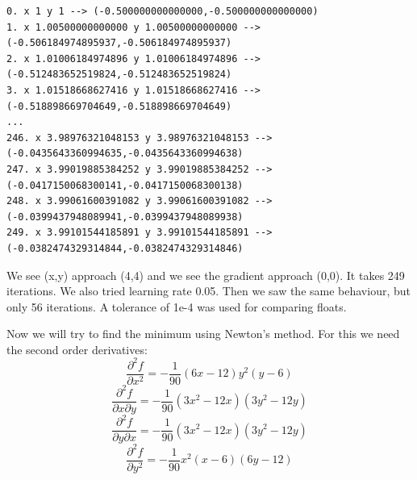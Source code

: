 \documentclass[12pt, letterpaper]{article}
\begin{document}
{\footnotesize
\begin{verbatim}
0. x 1 y 1 --> (-0.500000000000000,-0.500000000000000)
1. x 1.00500000000000 y 1.00500000000000 --> (-0.506184974895937,-0.506184974895937)
2. x 1.01006184974896 y 1.01006184974896 --> (-0.512483652519824,-0.512483652519824)
3. x 1.01518668627416 y 1.01518668627416 --> (-0.518898669704649,-0.518898669704649)
...
246. x 3.98976321048153 y 3.98976321048153 --> (-0.0435643360994635,-0.0435643360994638)
247. x 3.99019885384252 y 3.99019885384252 --> (-0.0417150068300141,-0.0417150068300138)
248. x 3.99061600391082 y 3.99061600391082 --> (-0.0399437948089941,-0.0399437948089938)
249. x 3.99101544185891 y 3.99101544185891 --> (-0.0382474329314844,-0.0382474329314846)
\end{verbatim}
}
We see (x,y) approach (4,4) and we see the gradient approach (0,0). It takes 249 iterations.
We also tried learning rate 0.05. Then we saw the same behaviour, but only 56 iterations.
A tolerance of 1e-4 was used for comparing floats.

Now we will try to find the minimum using Newton's method. For this we need the second order derivatives:\\
\[
\frac{\partial^2 f}{\partial x^2} = - \frac{1}{90}(6x-12)y^2(y-6)
\]
\[
\frac{\partial^2 f}{\partial x \partial y} = - \frac{1}{90}(3x^2-12x)(3y^2-12y)
\]
\[
\frac{\partial^2 f}{\partial y \partial x} = - \frac{1}{90}(3x^2-12x)(3y^2-12y)
\]
\[
\frac{\partial^2 f}{\partial y^2} = - \frac{1}{90}x^2(x-6)(6y-12)
\]
\end{document}
